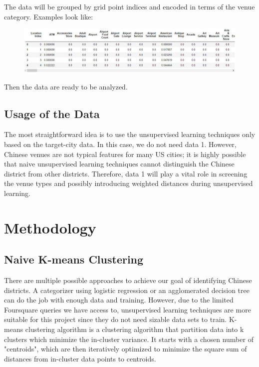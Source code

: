 \documentclass{article}
\begin{document}
\newpage

The data will be grouped by grid point indices and encoded in terms of the venue category. Examples look like:
\begin{figure}[h!]
\includegraphics[width=1.0\textwidth]{c6.jpg}
\centering
\end{figure}

Then the data are ready to be analyzed.

\subsection{Usage of the Data}

The most straightforward idea is to use the unsupervised learning techniques only based on the target-city data.
In this case, we do not need data 1.
However, Chinese venues are not typical features for many US cities; it is highly possible that naive unsupervised learning techniques cannot distinguish the Chinese district from other districts.
Therefore, data 1 will play a vital role in screening the venue types and possibly introducing weighted distances during unsupervised learning.

\newpage

\section{Methodology}
\subsection{Naive K-means Clustering}
There are multiple possible approaches to achieve our goal of identifying Chinese districts.
A categorizer using logistic regression or an agglomerated decision tree can do the job with enough data and training.
However, due to the limited Foursquare queries we have access to, unsupervised learning techniques are more suitable for this project since they do not need sizable data sets to train.
K-means clustering algorithm is a clustering algorithm that partition data into k clusters which minimize the in-cluster variance. It starts with a chosen number of "centroids", which are then iteratively optimized to minimize the square sum of distances from in-cluster data points to centroids.\cite{likas2003global}
\end{document}
